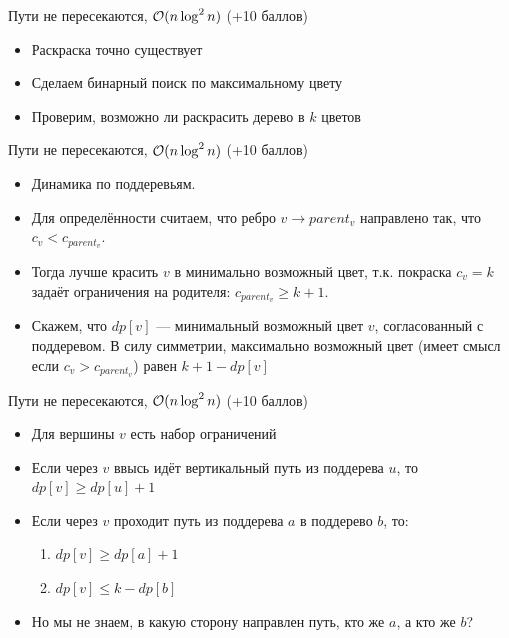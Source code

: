 \begin{frame}{Пути не пересекаются, $\mathcal{O}(n \log^2 n)$ (+10 баллов)}
  \begin{itemize}
    \item Раскраска точно существует
    \item Сделаем бинарный поиск по максимальному цвету
    \item Проверим, возможно ли раскрасить дерево в $k$ цветов
  \end{itemize}
\end{frame}

\begin{frame}{Пути не пересекаются, $\mathcal{O}(n \log^2 n)$ (+10 баллов)}
  \begin{itemize}
    \vspace{-1em}
  \item Динамика по поддеревьям.
  \item Для определённости считаем, что ребро $v \rightarrow parent_v$ направлено так, что $c_v < c_{parent_v}$.
  \item Тогда лучше красить $v$ в минимально возможный цвет, т.к. покраска $c_v = k$ задаёт ограничения на родителя:
    $c_{parent_v} \ge k + 1$.
  \item Скажем, что $dp[v]$ --- минимальный возможный цвет $v$, согласованный с поддеревом.
    В силу симметрии, максимально возможный цвет (имеет смысл если $c_v > c_{parent_v}$) равен $k + 1 - dp[v]$
  \end{itemize}
\end{frame}

\begin{frame}{Пути не пересекаются, $\mathcal{O}(n \log^2 n)$ (+10 баллов)}
  \begin{itemize}
    \item Для вершины $v$ есть набор ограничений
    \item Если через $v$ ввысь идёт вертикальный путь из поддерева $u$, то $dp[v] \ge dp[u] + 1$
    \item Если через $v$ проходит путь из поддерева $a$ в поддерево $b$, то:
    \begin{enumerate}
        \item $dp[v] \ge dp[a] + 1$
        \item $dp[v] \le k - dp[b]$
    \end{enumerate}
    \item Но мы не знаем, в какую сторону направлен путь, кто же $a$, а кто же $b$?
  \end{itemize}
\end{frame}

